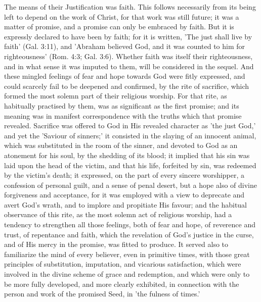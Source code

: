 \documentclass[
]{book}
\begin{document}
{  The means of their Justification was faith. This follows necessarily from its being left to depend on the work of Christ, for that work was still future; it was a matter of promise, and a promise can only be embraced by faith. But it is expressly declared to have been by faith; for it is written, 'The just shall live by faith' (Gal. 3:11), and 'Abraham believed God, and it was counted to him for righteousness' (Rom. 4:3; Gal. 3:6). Whether faith was itself their righteousness, and in what sense it was imputed to them, will be considered in the sequel.} And these mingled feelings of fear and hope towards God were fitly expressed, and could scarcely fail to be deepened and confirmed, by the rite of sacrifice, which formed the most solemn part of their religious worship. For that rite, as habitually practised by them, was as significant as the first promise; and its meaning was in manifest correspondence with the truths which that promise revealed. Sacrifice was offered to God in His revealed character as 'the just God,' and yet the 'Saviour of sinners;' it consisted in the slaying of an innocent animal, which was substituted in the room of the sinner, and devoted to God as an atonement for his soul, by the shedding of its blood; it implied that his sin was laid upon the head of the victim, and that his life, forfeited by sin, was redeemed by the victim's death; it expressed, on the part of every sincere worshipper, a confession of personal guilt, and a sense of penal desert, but a hope also of divine forgiveness and acceptance, for it was employed with a view to deprecate and avert God's wrath, and to implore and propitiate His favour; and the habitual observance of this rite, as the most solemn act of religious worship, had a tendency to strengthen all those feelings, both of fear and hope, of reverence and trust, of repentance and faith, which the revelation of God's justice in the curse, and of His mercy in the promise, was fitted to produce. It served also to familiarize the mind of every believer, even in primitive times, with those great principles of substitution, imputation, and vicarious satisfaction, which were involved in the divine scheme of grace and redemption, and which were only to be more fully developed, and more clearly exhibited, in connection with the person and work of the promised Seed, in 'the fulness of times.'
\end{document}

